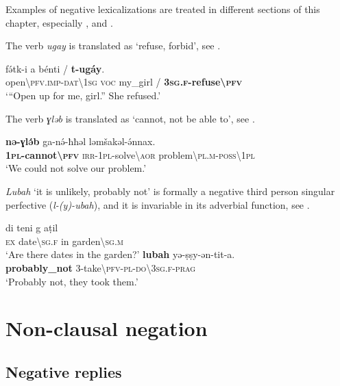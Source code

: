 \documentclass[output=paper,colorlinks,citecolor=brown]{langscibook}
\begin{document}
Examples of negative lexicalizations are treated in different sections of this chapter, especially ,  and .

The verb \textit{ugay} is translated as ‘refuse, forbid’, see .

\ea\label{ex:siw:35}
    \gll f\'{ə}tk-i a bénti / \textbf{t-ugáy}. \\
         open{\textbackslash}\textsc{pfv.imp-dat\textbackslash1sg} \textsc{voc} my\_girl / \textbf{\textsc{3sg.f}-refuse{\textbackslash}\textsc{pfv}} \\
    \glt ‘“Open up for me, girl.” She refused.’ 
\z

The verb \textit{ɣləb} is translated as ‘cannot, not be able to’, see .

\ea\label{ex:siw:36}
    \gll \textbf{nə-ɣlə́b} ga-nə́-ħħəl ləmšakəl-ə́nnax.\\
         \textbf{\textsc{1pl-}cannot{\textbackslash}\textsc{pfv}} \textsc{irr-1pl-}solve{\textbackslash}\textsc{aor} problem{\textbackslash}\textsc{pl.m-poss{\textbackslash}1pl}\\
    \glt ‘We could not solve our problem.'
\z

\textit{Lubah} ‘it is unlikely, probably not’ is formally a negative third person singular perfective (\textit{l-(y)-ubah}), and it is invariable in its adverbial function, see .


\ea\label{ex:siw:37}
\begin{xlist}[A: ]
    \gll di teni g aṭil \\
         \textsc{ex} date{\textbackslash}\textsc{sg.f} in garden{\textbackslash}\textsc{sg.m} \\
    \glt ‘Are there dates in the garden?’
    \gll \textbf{lubah} yə-ṣṣy-ən-tit-a. \\
          \textbf{probably\_not} 3-take{\textbackslash}\textsc{pfv-pl-do\textbackslash3sg.f-prag} \\
    \glt ‘Probably not, they took them.’
\end{xlist}
\z

\section{Non-clausal negation}\label{sec:siw:3}

\subsection{Negative replies}\label{sec:siw:3.1}
\end{document}
